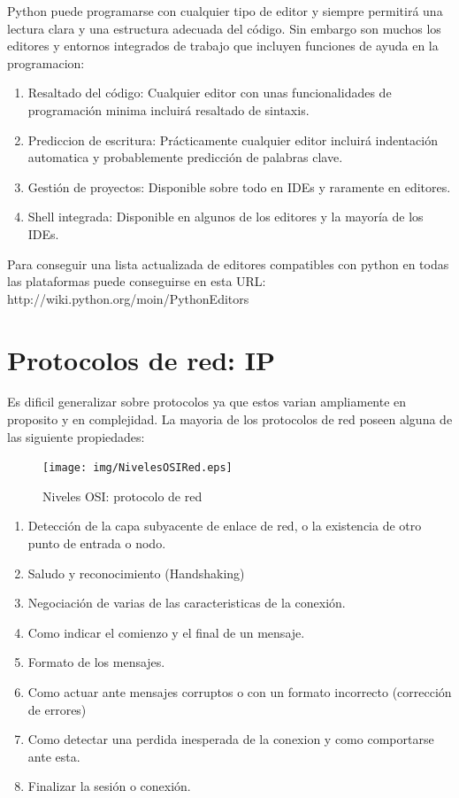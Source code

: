\documentclass[a4paper,spanish,12pt]{book}
\begin{document}
Python puede programarse con cualquier tipo de editor y siempre permitirá una lectura clara y una estructura adecuada del código. Sin embargo son muchos los editores y entornos integrados de trabajo que incluyen funciones de ayuda en la programacion:
\begin{enumerate}
	\item{Resaltado del código: Cualquier editor con unas funcionalidades de programación minima incluirá resaltado de sintaxis.}
	\item{Prediccion de escritura: Prácticamente cualquier editor incluirá indentación automatica y probablemente predicción de palabras clave.}
	\item{Gestión de proyectos: Disponible sobre todo en IDEs y raramente en editores.}
	\item{Shell integrada: Disponible en algunos de los editores y la mayoría de los IDEs.}
\end{enumerate}

Para conseguir una lista actualizada de editores compatibles con python en todas las plataformas puede conseguirse en esta URL: 
http://wiki.python.org/moin/PythonEditors


\section{Protocolos de red: IP}
Es dificil generalizar sobre protocolos ya que estos varian ampliamente en proposito y en complejidad. La mayoria de los protocolos de red poseen alguna de las siguiente propiedades:

\begin{figure}
	\texttt{[image: img/NivelesOSIRed.eps]}	
              \caption{Niveles OSI: protocolo de red}
  \label{fig:nivelesOSIRed}
\end{figure}


\begin{enumerate}
\item Detección de la capa subyacente de enlace de red, o la existencia de otro punto de entrada o nodo.
\item Saludo y reconocimiento (Handshaking)
\item Negociación de varias de las caracteristicas de la conexión.
\item Como indicar el comienzo y el final de un mensaje.
\item Formato de los mensajes.
\item Como actuar ante mensajes corruptos o con un formato incorrecto (corrección de errores)
\item Como detectar una perdida inesperada de la conexion y como comportarse ante esta.
\item Finalizar la sesión o conexión.
\end{enumerate}
\end{document}
